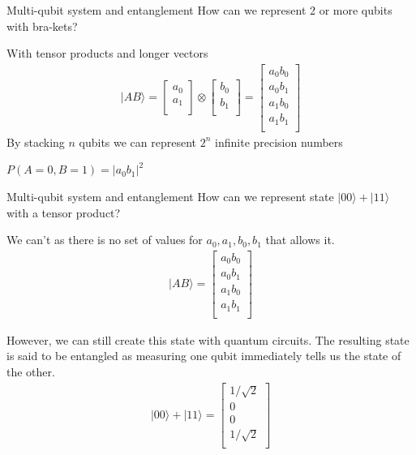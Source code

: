 \begin{frame}{Multi-qubit system and entanglement}
    How can we represent 2 or more qubits with bra-kets? 
    
    With tensor products and longer vectors
    \begin{align*}
	    \lvert AB\rangle
		=
		\begin{bmatrix}
        a_0 \\       
        a_1 \\
        \end{bmatrix}
		\otimes
        \begin{bmatrix}
        b_0 \\       
        b_1 \\
        \end{bmatrix}
        =
        \begin{bmatrix}
        a_0 b_0 \\
        a_0 b_1 \\
        a_1 b_0 \\
        a_1 b_1 \\
        \end{bmatrix}
    \end{align*}
    By stacking $n$ qubits we can represent $2^n$ infinite precision numbers
    
    \centering
    $P(A = 0, B = 1) = \lvert a_0 b_1 \rvert^2 $
\end{frame}


\begin{frame}{Multi-qubit system and entanglement}
    How can we represent state $\lvert 00\rangle + \lvert 11\rangle $ with a tensor product? 
    
    We can't as there is no set of values for $a_0, a_1, b_0, b_1$ that allows it.
    \begin{align*}
	    \lvert AB\rangle
		=
		\begin{bmatrix}
        a_0 b_0 \\
        a_0 b_1 \\
        a_1 b_0 \\
        a_1 b_1 \\
        \end{bmatrix}
    \end{align*}
    
    However, we can still create this state with quantum circuits. The resulting state is said to be entangled as measuring one qubit immediately tells us the state of the other.
    \begin{align*}
	    \lvert 00\rangle + \lvert 11\rangle 
		=
		\begin{bmatrix}
        1/\sqrt{2} \\
        0 \\
        0 \\
        1/\sqrt{2} \\
        \end{bmatrix}
    \end{align*}
\end{frame}
